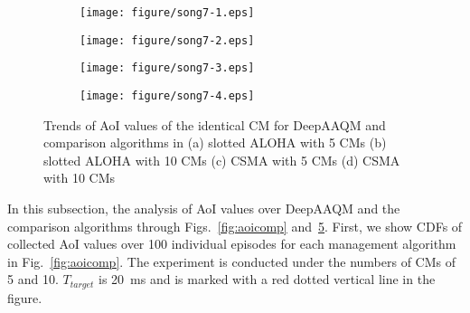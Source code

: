 \documentclass[journal]{IEEEtran}
\begin{document}
\begin{figure}
    \centering
    \begin{subfigure}{0.24\textwidth}
        \centering
        \texttt{[image: figure/song7-1.eps]}
        \caption{}
        \label{fig:sawaoi1}
    \end{subfigure}
    \begin{subfigure}{0.24\textwidth}
        \centering
        \texttt{[image: figure/song7-2.eps]}
        \caption{}
        \label{fig:sawaoi2}
    \end{subfigure}
    \hfill
    \begin{subfigure}{0.24\textwidth}
        \centering
        \texttt{[image: figure/song7-3.eps]}
        \caption{}
        \label{fig:sawaoi3}
    \end{subfigure}
    \begin{subfigure}{0.24\textwidth}
        \centering
        \texttt{[image: figure/song7-4.eps]}
        \caption{}
        \label{fig:sawaoi4}
    \end{subfigure}
    \caption{Trends of AoI values of the identical CM for DeepAAQM and comparison algorithms in (a) slotted ALOHA with 5 CMs (b) slotted ALOHA with 10 CMs (c) CSMA with 5 CMs (d) CSMA with 10 CMs }
    \label{fig:sawaoi}
\end{figure}

In this subsection, the analysis of AoI values over DeepAAQM and the comparison algorithms through Figs.~\ref{fig:aoicomp} and~\ref{fig:sawaoi}. First, we show CDFs of collected AoI values over 100 individual episodes for each management algorithm in Fig.~\ref{fig:aoicomp}. The experiment is conducted under the numbers of CMs of 5 and 10. $T_{target}$ is 20~ms and is marked with a red dotted vertical line in the figure.
\end{document}
